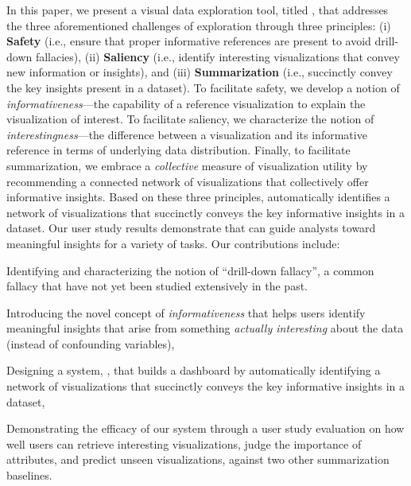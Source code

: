 \par In this paper, we present a visual data exploration tool, titled \system, that addresses the three aforementioned challenges of exploration through three principles: (i) \textbf{Safety} (i.e., ensure that proper informative references are present to avoid drill-down fallacies), (ii) \textbf{Saliency} (i.e., identify interesting visualizations that convey new information or insights), and (iii) \textbf{Summarization} (i.e., succinctly convey the key insights present in a dataset). To facilitate safety, we develop a notion of \emph{informativeness}---the capability of a reference visualization to explain the visualization of interest. To facilitate saliency, we characterize the notion of \emph{interestingness}---the difference between a visualization and its informative reference in terms of underlying data distribution. Finally, to facilitate summarization, we embrace a \emph{collective} measure of visualization utility by recommending a connected network of visualizations that collectively offer informative insights. Based on these three principles, \system automatically identifies a network of visualizations that succinctly conveys the key informative insights in a dataset. Our user study results demonstrate that \system can guide analysts toward meaningful insights for a variety of tasks. Our contributions include:
\begin{denselist}
\item Identifying and characterizing the notion of ``drill-down fallacy'', a common fallacy that have not yet been studied extensively in the past.
\item Introducing the novel concept of \emph{informativeness} that helps users identify meaningful insights that arise from something \textit{actually interesting} about the data (instead of confounding variables),
\item Designing a system, \system, that builds a dashboard by automatically identifying a network of visualizations that succinctly conveys the key informative insights in a dataset,
\item Demonstrating the efficacy of our system through a user study evaluation on how well users can retrieve interesting visualizations, judge the importance of attributes, and predict unseen visualizations, against two other summarization baselines.
\end{denselist}